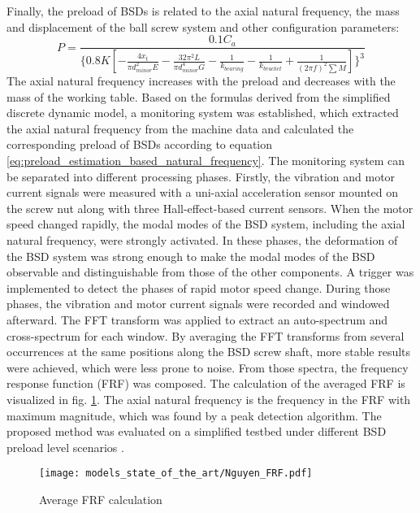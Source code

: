 Finally, the preload of BSDs is related to the axial natural frequency, the mass and displacement of the ball screw system and other configuration parameters:
\begin{equation}
    P=\frac{0.1C_{a}}{\{0.8K[ -\frac{4x_{t}}{\pi d_{minor}^{2}E} -\frac{32\pi^{2}L}{\pi d_{minor}^{4}G}-\frac{1}{k_{bearing}}-\frac{1}{k_{bracket}}+\frac{1}{(2\pi f)^{2}\sum M} ]\}^{3}}
\label{eq:preload_estimation_based_natural_frequency}
\end{equation}
The axial natural frequency increases with the preload and decreases with the mass of the working table. Based on the formulas derived from the simplified discrete dynamic model, a monitoring system was established, which extracted the axial natural frequency from the machine data and calculated the corresponding preload of BSDs according to equation \ref{eq:preload_estimation_based_natural_frequency}. The monitoring system can be separated into different processing phases. Firstly, the vibration and motor current signals were measured with a uni-axial acceleration sensor mounted on the screw nut along with three Hall-effect-based current sensors. When the motor speed changed rapidly, the modal modes of the BSD system, including the axial natural frequency, were strongly activated. In these phases, the deformation of the BSD system was strong enough to make the modal modes of the BSD observable and distinguishable from those of the other components. A trigger was implemented to detect the phases of rapid motor speed change. During those phases, the vibration and motor current signals were recorded and windowed afterward. The FFT transform was applied to extract an auto-spectrum and cross-spectrum for each window. By averaging the FFT transforms from several occurrences at the same positions along the BSD screw shaft, more stable results were achieved, which were less prone to noise. From those spectra, the frequency response function (FRF) was composed. The calculation of the averaged FRF is visualized in fig. \ref{fig:Nguyen_frf}. The axial natural frequency is the frequency in the FRF with maximum magnitude, which was found by a peak detection algorithm. The proposed method was evaluated on a simplified testbed under different BSD preload level scenarios \cite{NGUYEN2019}.

\begin{figure}[H]
  \centering
  \texttt{[image: models\_state\_of\_the\_art/Nguyen\_FRF.pdf]}
  \caption{Average FRF calculation \cite{NGUYEN2019}}
  \label{fig:Nguyen_frf}
\end{figure}

